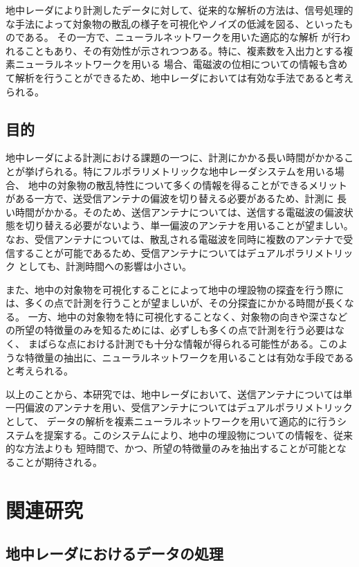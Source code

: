 \documentclass[11pt,a4paper,uplatex]{ujarticle}
\begin{document}
  地中レーダにより計測したデータに対して、従来的な解析の方法は、信号処理的な手法によって対象物の散乱の様子を可視化やノイズの低減を図る、といったものである。
  その一方で、ニューラルネットワークを用いた適応的な解析
  が行われることもあり、その有効性が示されつつある\cite{landmine_CNN}\cite{hidden_Markov}。特に、複素数を入出力とする複素ニューラルネットワークを用いる
  場合、電磁波の位相についての情報も含めて解析を行うことができるため、地中レーダにおいては有効な手法であると考えられる。

  \subsection{目的}

  地中レーダによる計測における課題の一つに、計測にかかる長い時間がかかることが挙げられる。特にフルポラリメトリックな地中レーダシステムを用いる場合、
  地中の対象物の散乱特性について多くの情報を得ることができるメリットがある一方で、送受信アンテナの偏波を切り替える必要があるため、計測に
  長い時間がかかる。そのため、送信アンテナについては、送信する電磁波の偏波状態を切り替える必要がないよう、単一偏波のアンテナを用いることが望ましい。
  なお、受信アンテナについては、散乱される電磁波を同時に複数のアンテナで受信することが可能であるため、受信アンテナについてはデュアルポラリメトリック
  としても、計測時間への影響は小さい。

  また、地中の対象物を可視化することによって地中の埋設物の探査を行う際には、多くの点で計測を行うことが望ましいが、その分探査にかかる時間が長くなる。
  一方、地中の対象物を特に可視化することなく、対象物の向きや深さなどの所望の特徴量のみを知るためには、必ずしも多くの点で計測を行う必要はなく、
  まばらな点における計測でも十分な情報が得られる可能性がある。このような特徴量の抽出に、ニューラルネットワークを用いることは有効な手段であると考えられる。

  以上のことから、本研究では、地中レーダにおいて、送信アンテナについては単一円偏波のアンテナを用い、受信アンテナについてはデュアルポラリメトリックとして、
  データの解析を複素ニューラルネットワークを用いて適応的に行うシステムを提案する。このシステムにより、地中の埋設物についての情報を、従来的な方法よりも
  短時間で、かつ、所望の特徴量のみを抽出することが可能となることが期待される。


\section{関連研究}

  \subsection{地中レーダにおけるデータの処理}
\end{document}
